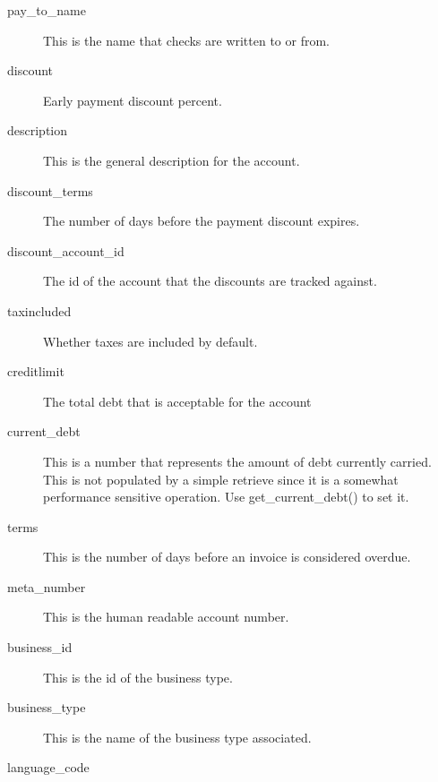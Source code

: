 \begin{description}
\begin{description}
\begin{description}
\begin{description}
\begin{description}
\begin{description}
\begin{description}
\begin{description}
\begin{description}
\item[{pay\_to\_name}] \mbox{}

This is the name that checks are written to or from.


\item[{discount}] \mbox{}

Early payment discount percent.


\item[{description}] \mbox{}

This is the general description for the account.


\item[{discount\_terms}] \mbox{}

The number of days before the payment discount expires.


\item[{discount\_account\_id}] \mbox{}

The id of the account that the discounts are tracked against.


\item[{taxincluded}] \mbox{}

Whether taxes are included by default.


\item[{creditlimit}] \mbox{}

The total debt that is acceptable for the account


\item[{current\_debt}] \mbox{}

This is a number that represents the amount of debt currently carried.  This is
not populated by a simple retrieve since it is a somewhat performance sensitive
operation.  Use get\_current\_debt() to set it.


\item[{terms}] \mbox{}

This is the number of days before an invoice is considered overdue.


\item[{meta\_number}] \mbox{}

This is the human readable account number.


\item[{business\_id}] \mbox{}

This is the id of the business type.


\item[{business\_type}] \mbox{}

This is the name of the business type associated.


\item[{language\_code}] \mbox{}


\end{description}
\end{description}
\end{description}
\end{description}
\end{description}
\end{description}
\end{description}
\end{description}
\end{description}

